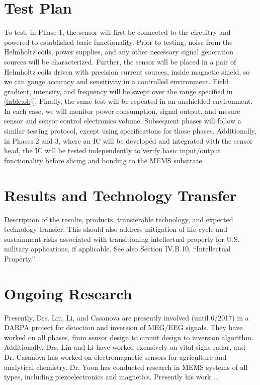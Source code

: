 \section{Test Plan}

To test, in Phase 1, the sensor will first be connected to the circuitry and powered to established basic functionality.  Prior to testing, noise from the Helmholtz coils, power supplies, and any other necessary signal generation sources will be characterized. Further, the sensor will be placed in a pair of Helmholtz coils driven with precision current sources, inside magnetic shield, so we can gauge accuracy and sensitivity in a controlled environment. Field gradient, intensity, and frequency will be swept over the range specified in \ref{table:obj}. Finally, the same test will be repeated in an unshielded environment. In each case, we will monitor power consumption, signal output, and mesure sensor and sensor control electronics volume. Subsequent phases will follow a similar testing protocol, except using specifications for those phases. Additionally, in Phases 2 and 3, where an IC will be developed and integrated with the sensor head, the IC will be tested independently to verify basic input/output functionality before slicing and bonding to the MEMS substrate.

\section{Results and Technology Transfer}
Description of the results, products, transferable technology, and expected technology
transfer. This should also address mitigation of life-cycle and sustainment risks associated
with transitioning intellectual property for U.S. military applications, if applicable. See also
Section IV.B.10, “Intellectual Property.”

\section{Ongoing Research}
Presently, Drs. Lin, Li, and Casanova are presently involved (until 6/2017) in a DARPA project for detection and inversion of MEG/EEG signals. They have worked on all phases, from sensor design to circuit design to inversion algorithm. Additionally, Drs. Lin and Li have worked exensively on vital signs radar, and Dr. Casanova has worked on electromagnetic sensors for agriculture and analytical chemistry. Dr. Yoon has conducted research in MEMS systems of all types, including piezoelectronics and magnetics. Presently his work ...

